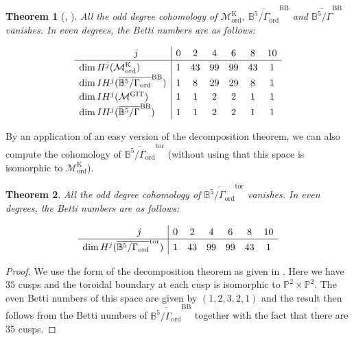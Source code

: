 \documentclass[12pt, pdftex]{amsart}
\theoremstyle{plain}
\newtheorem{thm}{Theorem}[section]
\theoremstyle{definition}
\numberwithin{equation}{section}
\def\P{{\mathbb P}}
\def\B{{\mathbb B}}
\def\dim{\mathop{\mathrm{dim}}\nolimits}
\def\ord{\mathrm{ord}}
\def\GIT{\mathrm{GIT}}
\def\K{\mathrm{K}}
\def\tor{\mathrm{tor}}
\def\BB{\mathrm{BB}}
\def\M{\mathcal{M}}
\begin{document}
\begin{thm}[{\cite[Table III, Theorem 8.6]{KLW87}}, {\cite[Table, p.40]{Ki89}}]
\label{thm:coh_previous_work}
All the odd degree cohomology of $\M_{\ord}^{\K}$,  $\overline{\B^5/\Gamma_{\ord}}^{\BB}$ and $\overline{\B^5/\Gamma}^{\BB}$ vanishes.
In even degrees, the Betti numbers are as follows:


\begin{align*}
\renewcommand*{\arraystretch}{1.2}
\begin{array}{l|cccccc}
\hskip2cm j&0&2&4&6&8&10\\\hline
\dim H^j(\M_{\ord}^{\K})&1&43&99&99&43&1\\
\dim IH^j(\overline{\B^5/\Gamma_{\ord}}^{\BB})&1&8&29&29&8&1\\
\dim IH^j(\M^{\GIT})&1&1&2&2&1&1\\
\dim IH^j(\overline{\B^5/\Gamma}^{\BB})&1&1&2&2&1&1\\
\end{array}
\end{align*}
\end{thm}


By an application of an easy version of the decomposition theorem, we can also compute the cohomology of $\overline{\B^5/\Gamma_{\ord}}^{\tor}$ (without using that this space is isomorphic 
to $\M_{\ord}^{\K}$). 

\begin{thm}
\label{thm:coh_ordered_tor}
All the odd degree cohomology of $\overline{\B^5/\Gamma_{\ord}}^{\tor}$ vanishes.
In even degrees, the Betti numbers are as follows:


\begin{align*}
\renewcommand*{\arraystretch}{1.2}
\begin{array}{l|cccccc}
\hskip2cm j&0&2&4&6&8&10\\\hline
\dim H^j(\overline{\B^5/\Gamma_{\ord}}^{\tor})&1&43&99&99&43&1\\
\end{array}
\end{align*}
\end{thm}
\begin{proof}
We use the form of the decomposition theorem as given in \cite[Lemma 9.1]{GH17}. Here we have $35$ cusps and the toroidal boundary at each cusp is isomorphic to $\P^2 \times \P^2$. The even
Betti numbers of this space are given by $(1,2,3,2,1)$ and the result then follows from the Betti numbers of $\overline{\B^5/\Gamma_{\ord}}^{\BB}$ together with the fact that there are 35 cusps.   
\end{proof}
\end{document}
